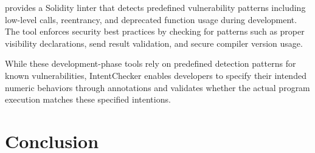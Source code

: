 \documentclass[pdflatex,sn-basic]{sn-jnl}%
\theoremstyle{thmstyleone}%
\theoremstyle{thmstyletwo}%
\theoremstyle{thmstylethree}%
\begin{document}
\citep{solhint} provides a Solidity linter that detects predefined vulnerability patterns including low-level calls, reentrancy, and deprecated function usage during development.
The tool enforces security best practices by checking for patterns such as proper visibility declarations, send result validation, and secure compiler version usage.

While these development-phase tools rely on predefined detection patterns for known vulnerabilities,
IntentChecker enables developers to specify their intended numeric behaviors through annotations and validates whether the actual program execution matches these specified intentions.

\section{Conclusion}\label{sec:conclusion}
\newif\ifshowack
\showackfalse

\ifshowack
  \section*{Acknowledgment}
\fi
\end{document}
